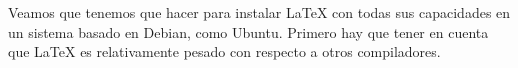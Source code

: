 

Veamos que tenemos que hacer para instalar \LaTeX{} con todas sus
capacidades en un sistema basado en Debian, como Ubuntu.
Primero hay que tener en cuenta que \LaTeX{} es relativamente pesado
con respecto a otros compiladores. \\

